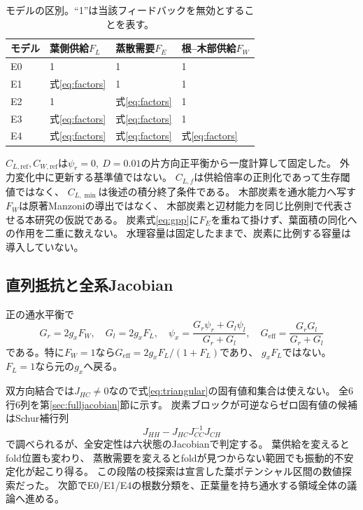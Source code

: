 \documentclass[a4paper,11pt]{ltjsarticle}
\begin{document}
\begin{table}[tb]
\centering
\caption{モデルの区別。``1''は当該フィードバックを無効とすることを表す。}
\begin{tabular}{llll}
\toprule
モデル&葉側供給$F_L$&蒸散需要$F_E$&根--木部供給$F_W$\\\midrule
E0&1&1&1\\
E1&式\eqref{eq:factors}&1&1\\
E2&1&式\eqref{eq:factors}&1\\
E3&式\eqref{eq:factors}&式\eqref{eq:factors}&1\\
E4&式\eqref{eq:factors}&式\eqref{eq:factors}&式\eqref{eq:factors}\\
\bottomrule
\end{tabular}
\end{table}

$C_{L,\mathrm{ref}},C_{W,\mathrm{ref}}$は$\psi_r=0,\ D=0.01$の片方向正平衡から一度計算して固定した。
外力変化中に更新する基準値ではない。
$C_{L,f}$は供給倍率の正則化であって生存閾値ではなく、
$C_{L,\min}$は後述の積分終了条件である。
木部炭素を通水能力へ写す$F_W$は原著Manzoniの導出ではなく、
木部炭素と辺材能力を同じ比例則で代表させる本研究の仮説である。
炭素式\eqref{eq:gpp}に$F_E$を重ねて掛けず、葉面積の同化への作用を二重に数えない。
水理容量は固定したままで、炭素に比例する容量は導入していない。

\subsection{直列抵抗と全系Jacobian}
正の通水平衡で
\begin{equation}\label{eq:series}
 G_r=2g_xF_W,\quad G_l=2g_xF_L,\quad
 \psi_x=\frac{G_r\psi_r+G_l\psi_l}{G_r+G_l},\quad
 G_{\mathrm{eff}}=\frac{G_rG_l}{G_r+G_l}
\end{equation}
である。特に$F_W=1$なら$G_{\mathrm{eff}}=2g_xF_L/(1+F_L)$であり、
$g_xF_L$ではない。$F_L=1$なら元の$g_x$へ戻る。

双方向結合では$J_{HC}\ne0$なので式\eqref{eq:triangular}の固有値和集合は使えない。
全6行6列を第\ref{sec:fulljacobian}節に示す。
炭素ブロックが可逆ならゼロ固有値の候補はSchur補行列
\begin{equation}
 J_{HH}-J_{HC}J_{CC}^{-1}J_{CH}
\end{equation}
で調べられるが、全安定性は六状態のJacobianで判定する。
葉供給を変えるとfold位置も変わり、
蒸散需要を変えるとfoldが見つからない範囲でも振動的不安定化が起こり得る。
この段階の枝探索は宣言した葉ポテンシャル区間の数値探索だった。
次節でE0/E1/E4の根数分類を、正葉量を持ち通水する領域全体の議論へ進める。
\end{document}
